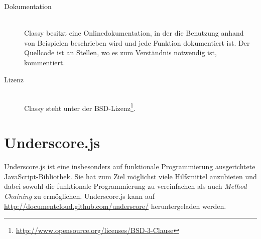 \begin{description}
\item[Dokumentation] \hfill \\
Classy besitzt eine Onlinedokumentation, in der die Benutzung anhand von Beispielen beschrieben
wird und jede Funktion dokumentiert ist. Der Quellcode ist an Stellen, wo es zum Verständnis
notwendig ist, kommentiert.

\item[Lizenz] \hfill \\
Classy steht unter der
BSD-Lizenz\footnote{\href{http://www.opensource.org/licenses/BSD-3-Clause}{http://www.opensource.org/licenses/BSD-3-Clause}}.
\end{description}





\section{Underscore.js}
Underscore.js ist eine insbesonders auf funktionale Programmierung ausgerichtete
JavaScript-Bibliothek. Sie hat zum Ziel möglichst viele Hilfsmittel anzubieten und dabei sowohl die
funktionale  Programmierung zu vereinfachen als auch \emph{Method Chaining} zu ermöglichen.
Underscore.js kann auf
\href{http://documentcloud.github.com/underscore/}{http://documentcloud.github.com/underscore/}
heruntergeladen werden.

